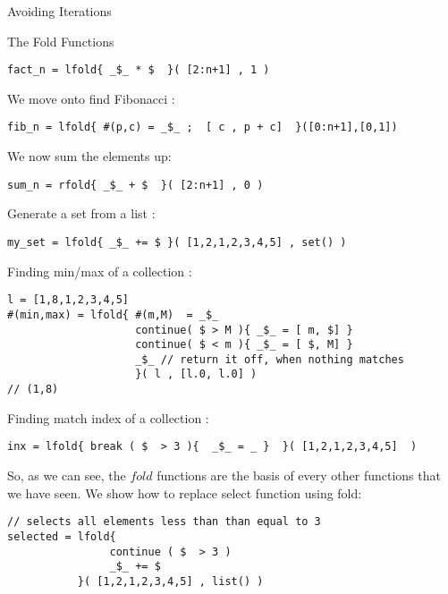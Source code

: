 \begin{section}{Avoiding Iterations}
\begin{subsection}{The Fold Functions}
\begin{lstlisting}[style=JexlStyle]
fact_n = lfold{ _$_ * $  }( [2:n+1] , 1 )
\end{lstlisting}

We move onto find Fibonacci : 

\begin{lstlisting}[style=JexlStyle]
fib_n = lfold{ #(p,c) = _$_ ;  [ c , p + c]  }([0:n+1],[0,1])
\end{lstlisting}

We now sum the elements up: 

\begin{lstlisting}[style=JexlStyle]
sum_n = rfold{ _$_ + $  }( [2:n+1] , 0 )
\end{lstlisting}

Generate a set from a list : 

\begin{lstlisting}[style=JexlStyle]
my_set = lfold{ _$_ += $ }( [1,2,1,2,3,4,5] , set() )
\end{lstlisting}

Finding min/max of a collection : 

\begin{lstlisting}[style=JexlStyle]
l = [1,8,1,2,3,4,5] 
#(min,max) = lfold{ #(m,M)  = _$_ 
                    continue( $ > M ){ _$_ = [ m, $] }   
                    continue( $ < m ){ _$_ = [ $, M] } 
                    _$_ // return it off, when nothing matches   
                    }( l , [l.0, l.0] )
// (1,8)                    
\end{lstlisting}

Finding match index of a collection : 

\begin{lstlisting}[style=JexlStyle]
inx = lfold{ break ( $  > 3 ){  _$_ = _ }  }( [1,2,1,2,3,4,5]  )
\end{lstlisting}

So, as we can see, the $fold$ functions are the basis of every other functions
that we have seen. We show how to replace select function using fold: 
\begin{lstlisting}[style=JexlStyle]
// selects all elements less than than equal to 3
selected = lfold{ 
                continue ( $  > 3 )  
                _$_ += $   
           }( [1,2,1,2,3,4,5] , list() )
\end{lstlisting}


\end{subsection}
\end{section}
